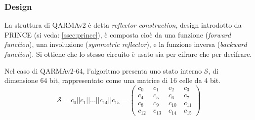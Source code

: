\documentclass[target=bach,aauheader=,style=]{thud}
\begin{document}
			\subsubsection{Design}
			La struttura di QARMAv2 è detta \textit{reflector construction}, design introdotto da PRINCE (si veda: \ref{ssec:prince}), è composta cioè da una funzione (\textit{forward function}), una involuzione (\textit{symmetric reflector}), e la funzione inversa (\textit{backward function}). Si ottiene che lo stesso circuito è usato sia per cifrare che per decifrare.
			
			Nel caso di QARMAv2-64, l'algoritmo presenta uno stato interno $\mathcal{S}$, di dimensione 64 bit, rappresentato come una matrice di 16 celle da 4 bit.
			\[
				\mathcal{S} = c_0||c_1||...||c_{14}||c_{15} = 
				\begin{pmatrix}
					c_0\ & c_1\ & c_2\ & c_3\\
					c_4\ & c_5\ & c_6\ & c_7\\
					c_8\ & c_9\ & c_{10}\ & c_{11}\\
					c_{12}\ & c_{13}\ & c_{14}\ & c_{15}
				\end{pmatrix}
			\]
			
\end{document}
